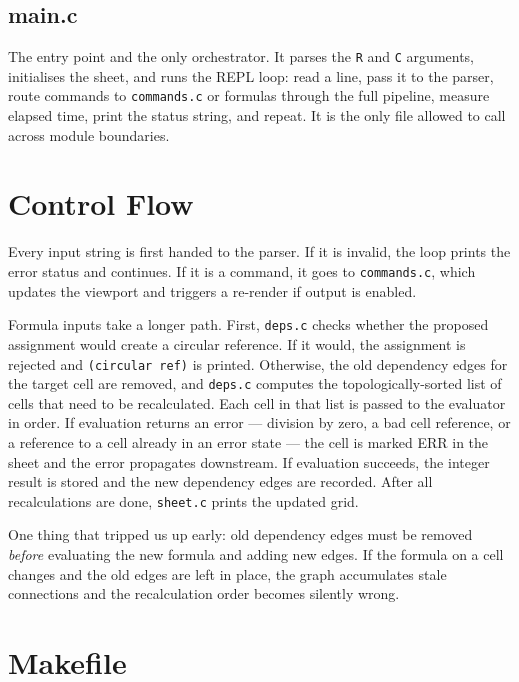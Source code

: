 \documentclass[11pt,a4paper]{article}
\begin{document}
\subsection{main.c}

The entry point and the only orchestrator. It parses the \texttt{R} and \texttt{C} arguments, initialises the sheet, and runs the REPL loop: read a line, pass it to the parser, route commands to \texttt{commands.c} or formulas through the full pipeline, measure elapsed time, print the status string, and repeat. It is the only file allowed to call across module boundaries.

\section{Control Flow}

Every input string is first handed to the parser. If it is invalid, the loop prints the error status and continues. If it is a command, it goes to \texttt{commands.c}, which updates the viewport and triggers a re-render if output is enabled.

Formula inputs take a longer path. First, \texttt{deps.c} checks whether the proposed assignment would create a circular reference. If it would, the assignment is rejected and \texttt{(circular ref)} is printed. Otherwise, the old dependency edges for the target cell are removed, and \texttt{deps.c} computes the topologically-sorted list of cells that need to be recalculated. Each cell in that list is passed to the evaluator in order. If evaluation returns an error --- division by zero, a bad cell reference, or a reference to a cell already in an error state --- the cell is marked ERR in the sheet and the error propagates downstream. If evaluation succeeds, the integer result is stored and the new dependency edges are recorded. After all recalculations are done, \texttt{sheet.c} prints the updated grid.

One thing that tripped us up early: old dependency edges must be removed \emph{before} evaluating the new formula and adding new edges. If the formula on a cell changes and the old edges are left in place, the graph accumulates stale connections and the recalculation order becomes silently wrong.

\section{Makefile}
\end{document}
